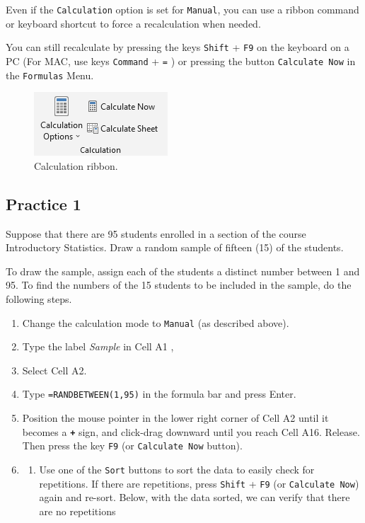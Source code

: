 \documentclass[
]{book}
\providecommand{\tightlist}{%
  \setlength{\itemsep}{0pt}\setlength{\parskip}{0pt}}
\begin{document}
Even if the \texttt{Calculation} option is set for \texttt{Manual}, you can use a ribbon command or keyboard shortcut to force a recalculation when needed.

You can still recalculate by pressing the keys \texttt{Shift} + \texttt{F9} on the keyboard on a PC (For MAC, use keys \texttt{Command} + \texttt{=} ) or pressing the button \texttt{Calculate\ Now} in the \texttt{Formulas} Menu.

\begin{figure}

{\centering \includegraphics[width=0.3\linewidth]{recalc-pc} 

}

\caption{Calculation ribbon.}\label{fig:calculation-ribbons}
\end{figure}

\hypertarget{practice-1-1}{%
\subsection{Practice 1}\label{practice-1-1}}

Suppose that there are 95 students enrolled in a section of the course Introductory Statistics. Draw a random sample of fifteen (15) of the students.

To draw the sample, assign each of the students a distinct number between 1 and 95. To find the numbers of the 15 students to be included in the sample, do the following steps.

\begin{enumerate}
\def\labelenumi{\arabic{enumi}.}
\item
  Change the calculation mode to \texttt{Manual} (as described above).
\item
  Type the label \emph{Sample} in Cell A1 ,
\item
  Select Cell A2.
\item
  Type \texttt{=RANDBETWEEN(1,95)} in the formula bar and press Enter.
\item
  Position the mouse pointer in the lower right corner of Cell A2 until it becomes a \textbf{\texttt{+}} sign, and click-drag downward until you reach Cell A16. Release. Then press the key \texttt{F9} (or \texttt{Calculate\ Now} button).
\item
  \begin{enumerate}
  \def\labelenumii{\arabic{enumii})}
  \setcounter{enumii}{5}
  \tightlist
  \item
    Use one of the \texttt{Sort} buttons to sort the data to easily check for repetitions. If there are repetitions, press \texttt{Shift} + \texttt{F9} (or \texttt{Calculate\ Now}) again and re-sort. Below, with the data sorted, we can verify that there are no repetitions
  \end{enumerate}
\end{enumerate}
\end{document}
